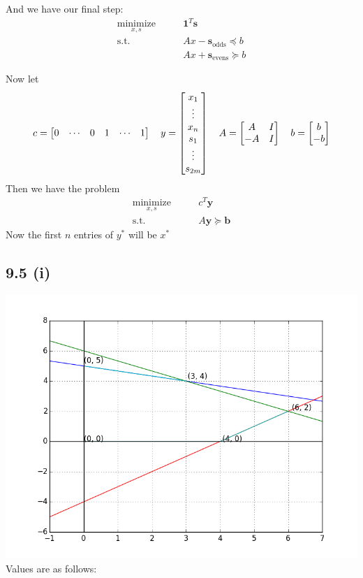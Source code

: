 \documentclass[letterpaper,12pt]{article}
\theoremstyle{definition}
\begin{document}
And we have our final step:
\begin{align*}
\underset{x,s}{\text{minimize}} \qquad &\mathbf{1}^T \mathbf{s} \\ 
\text{s.t.}\qquad & Ax -\mathbf{s}_{\text{odds}}  \preceq b\\
& Ax+\mathbf{s}_{\text{evens}} \succeq b
\end{align*}

Now let 
\[c = 
\begin{bmatrix}
    0 & \cdots & 0 & 1 & \cdots & 1
\end{bmatrix}\\\quad 
y = 
\begin{bmatrix}
x_1 \\ 
\vdots \\ x_n \\ s_1 \\ \vdots \\ s_{2m}
\end{bmatrix}
\\ \quad A = 
\begin{bmatrix}
    A & I \\ -A & I
\end{bmatrix}
\\ \quad b  = 
\begin{bmatrix}
    b\\-b
\end{bmatrix}
\]
Then we have the problem
\begin{align*}
\underset{x,s}{\text{minimize}} \qquad & c^T \mathbf{y}\\
\text{s.t.} \qquad & A \mathbf{y} \succeq \mathbf{b}
\end{align*}
Now the first $n$ entries of $y^*$ will be $x^*$


\subsection*{9.5 (i)}

\includegraphics[scale = .75]{first95}
Values are as follows:
\end{document}
